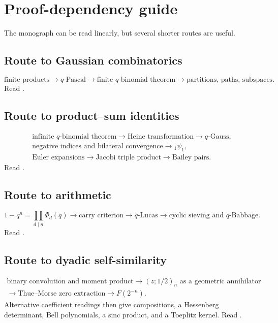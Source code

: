 \documentclass[11pt,oneside,openany]{book}
\theoremstyle{definition}
\theoremstyle{remark}
\begin{document}
\chapter{Proof-dependency guide}\label{app:dependencies}

The monograph can be read linearly, but several shorter routes are useful.

\section*{Route to Gaussian combinatorics}
\[
 \text{finite products}
 \longrightarrow q\text{-Pascal}
 \longrightarrow \text{finite }q\text{-binomial theorem}
 \longrightarrow \text{partitions, paths, subspaces}.
\]
Read .

\section*{Route to product--sum identities}
\[
\begin{gathered}
 \text{infinite }q\text{-binomial theorem}
 \longrightarrow \text{Heine transformation}
 \longrightarrow q\text{-Gauss},\\
 \text{negative indices and bilateral convergence}
 \longrightarrow {}_1\psi_1,\\
 \text{Euler expansions}
 \longrightarrow \text{Jacobi triple product}
 \longrightarrow \text{Bailey pairs}.
\end{gathered}
\]
Read .

\section*{Route to arithmetic}
\[
 1-q^n=\prod_{d\mid n}\Phi_d(q)
 \longrightarrow \text{carry criterion}
 \longrightarrow q\text{-Lucas}
 \longrightarrow \text{cyclic sieving and }q\text{-Babbage}.
\]
Read .

\section*{Route to dyadic self-similarity}
\[
\begin{gathered}
 \text{binary convolution and moment product}
 \longrightarrow (z;1/2)_n\text{ as a geometric annihilator}\\
 \longrightarrow \text{Thue--Morse zero extraction}
 \longrightarrow F(2^{-n}).
\end{gathered}
\]
Alternative coefficient readings then give compositions, a Hessenberg determinant, Bell polynomials, a sinc product, and a Toeplitz kernel.  Read .
\end{document}
